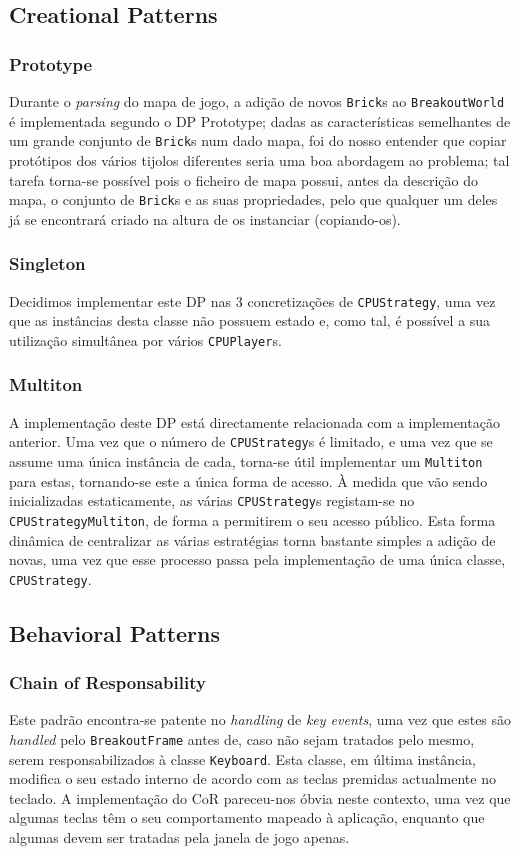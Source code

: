 \documentclass[a4paper]{article}
\begin{document}
\subsection{Creational Patterns}
\subsubsection{Prototype}
\noindent Durante o \textit{parsing} do mapa de jogo, a adição de novos \texttt{Brick}s ao \texttt{BreakoutWorld} é implementada segundo o DP Prototype; dadas as características semelhantes de um grande conjunto de \texttt{Brick}s num dado mapa, foi do nosso entender que copiar protótipos dos vários tijolos diferentes seria uma boa abordagem ao problema; tal tarefa torna-se possível pois o ficheiro de mapa possui, antes da descrição do mapa, o conjunto de \texttt{Brick}s e as suas propriedades, pelo que qualquer um deles já se encontrará criado na altura de os instanciar (copiando-os).

\subsubsection{Singleton}
\noindent Decidimos implementar este DP nas 3 concretizações de \texttt{CPUStrategy}, uma vez que as instâncias desta classe não possuem estado e, como tal, é possível a sua utilização simultânea por vários \texttt{CPUPlayer}s.

\subsubsection{Multiton}
\noindent A implementação deste DP está directamente relacionada com a implementação anterior. Uma vez que o número de \texttt{CPUStrategy}s é limitado, e uma vez que se assume uma única instância de cada, torna-se útil implementar um \texttt{Multiton} para estas, tornando-se este a única forma de acesso. À medida que vão sendo inicializadas estaticamente, as várias \texttt{CPUStrategy}s registam-se no \texttt{CPUStrategyMultiton}, de forma a permitirem o seu acesso público. Esta forma dinâmica de centralizar as várias estratégias torna bastante simples a adição de novas, uma vez que esse processo passa pela implementação de uma única classe, \texttt{CPUStrategy}.

\subsection{Behavioral Patterns}
\subsubsection{Chain of Responsability}
\noindent Este padrão encontra-se patente no \textit{handling} de \textit{key events}, uma vez que estes são \textit{handled} pelo \texttt{BreakoutFrame} antes de, caso não sejam tratados pelo mesmo, serem responsabilizados à classe \texttt{Keyboard}. Esta classe, em última instância, modifica o seu estado interno de acordo com as teclas premidas actualmente no teclado. A implementação do CoR pareceu-nos óbvia neste contexto, uma vez que algumas teclas têm o seu comportamento mapeado à aplicação, enquanto que algumas devem ser tratadas pela janela de jogo apenas.
\end{document}
